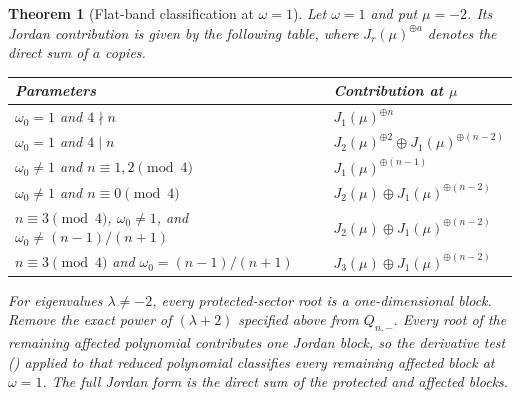 \documentclass[twoside,10pt]{article}
\numberwithin{equation}{section}
\theoremstyle{slbody}
\newtheorem{theorem}{Theorem}[section]
\theoremstyle{definition}
\theoremstyle{remark}
\renewcommand{\eqref}[1]{%
  \textup{{\normalfont(\oldstylenums{\ref{#1}}}\normalfont)}}
\begin{document}
\begin{theorem}[Flat-band classification at $\omega=1$]
\label{thm:flat-band}
Let $\omega=1$ and put $\mu=-2$.
Its Jordan contribution is given by the following table, where
$J_r(\mu)^{\oplus a}$ denotes the direct sum of $a$ copies.
\begin{center}
\begin{tabular}{L{0.57\textwidth}L{0.31\textwidth}}
\hline
Parameters & Contribution at $\mu$\\
\hline
$\omega_0=1$ and $4\nmid n$
  & $J_1(\mu)^{\oplus n}$\\
$\omega_0=1$ and $4\mid n$
  & $J_2(\mu)^{\oplus2}\oplus J_1(\mu)^{\oplus(n-2)}$\\
$\omega_0\ne1$ and $n\equiv1,2\pmod4$
  & $J_1(\mu)^{\oplus(n-1)}$\\
$\omega_0\ne1$ and $n\equiv0\pmod4$
  & $J_2(\mu)\oplus J_1(\mu)^{\oplus(n-2)}$\\
$n\equiv3\pmod4$, $\omega_0\ne1$, and
$\omega_0\ne(n-1)/(n+1)$
  & $J_2(\mu)\oplus J_1(\mu)^{\oplus(n-2)}$\\
$n\equiv3\pmod4$ and $\omega_0=(n-1)/(n+1)$
  & $J_3(\mu)\oplus J_1(\mu)^{\oplus(n-2)}$\\
\hline
\end{tabular}
\end{center}
For eigenvalues $\lambda\ne-2$, every protected-sector root is a
one-dimensional block.  Remove the exact power of $(\lambda+2)$
specified above from $Q_{n,-}$.  Every root of the remaining affected
polynomial contributes one Jordan block, so the derivative test
\eqref{eq:affected-ep} applied to that reduced polynomial classifies
every remaining affected block at $\omega=1$.  The full
Jordan form is the direct sum of the protected and affected blocks.
\end{theorem}
\end{document}
